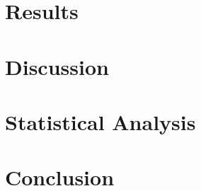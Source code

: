 \documentclass[12pt]{report}
\begin{document}
\section*{Results}

\section*{Discussion}

\section*{Statistical Analysis}

\section*{Conclusion}
\end{document}
